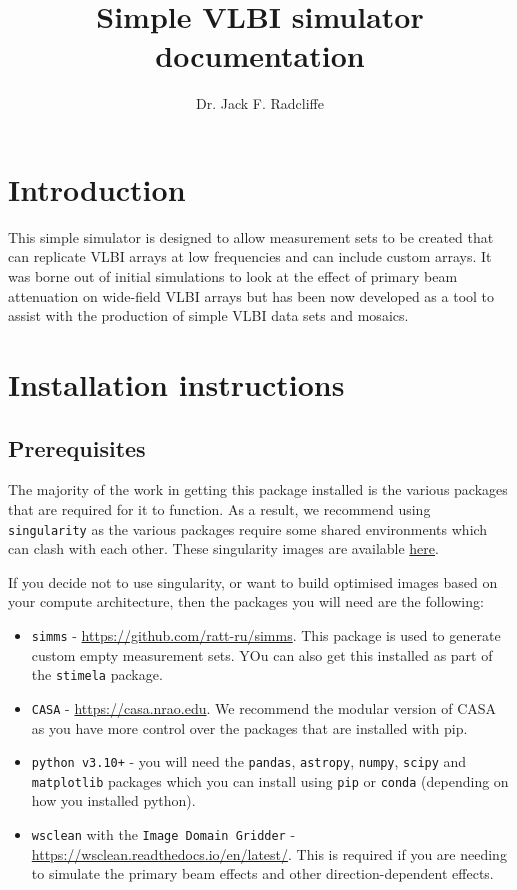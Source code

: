 \documentclass[11pt]{report_jfr}
\title{\fontfamily{lmss}\selectfont Simple VLBI simulator documentation\vspace{-1em}}
\date{\vspace{-3.5em}}
\author{\fontfamily{lmss}\selectfont Dr. Jack F. Radcliffe\vspace{-2em}}
\begin{document}
\maketitle
\thispagestyle{coverstyle}
\selectfont

\section{Introduction}
This simple simulator is designed to allow measurement sets to be created that can replicate VLBI arrays at low frequencies and can include custom arrays. It was borne out of initial simulations to look at the effect of primary beam attenuation on wide-field VLBI arrays but has been now developed as a tool to assist with the production of simple VLBI data sets and mosaics. 

\section{Installation instructions}
\subsection{Prerequisites}
The majority of the work in getting this package installed is the various packages that are required for it to function. As a result, we recommend using \texttt{singularity} as the various packages require some shared environments which can clash with each other. These singularity images are available \href{ss}{here}.

If you decide not to use singularity, or want to build optimised images based on your compute architecture, then the packages you will need are the following:
%
\begin{itemize}
	\item \texttt{simms} - \href{https://github.com/ratt-ru/simms}{https://github.com/ratt-ru/simms}. This package is used to generate custom empty measurement sets. YOu can also get this installed as part of the \texttt{stimela} package.
	\item \texttt{CASA} - \href{https://casa.nrao.edu}{https://casa.nrao.edu}. We recommend the modular version of CASA as you have more control over the packages that are installed with pip. 
	\item \texttt{python v3.10+} - you will need the \texttt{pandas}, \texttt{astropy}, \texttt{numpy}, \texttt{scipy} and \texttt{matplotlib} packages which you can install using \texttt{pip} or \texttt{conda} (depending on how you installed python).
	\item \texttt{wsclean} with the \texttt{Image Domain Gridder} - \href{https://wsclean.readthedocs.io/en/latest/}{https://wsclean.readthedocs.io/en/latest/}. This is required if you are needing to simulate the primary beam effects and other direction-dependent effects. 
\end{itemize}
\end{document}
